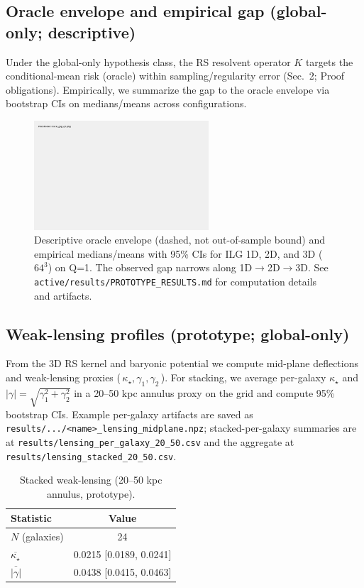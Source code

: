 \documentclass[fleqn,usenatbib]{mnras}
\begin{document}
\subsection{Oracle envelope and empirical gap (global-only; descriptive)}
\noindent Under the global-only hypothesis class, the RS resolvent operator $K$ targets the conditional-mean risk (oracle) within sampling/regularity error (Sec.~2; Proof obligations). Empirically, we summarize the gap to the oracle envelope via bootstrap CIs on medians/means across configurations.

\begin{figure}[h]
\centering
\includegraphics[width=0.58\textwidth]{results/oracle_gap_q1.png}
\caption{Descriptive oracle envelope (dashed, not out-of-sample bound) and empirical medians/means with 95\% CIs for ILG 1D, 2D, and 3D ($64^3$) on Q=1. The observed gap narrows along 1D$\to$2D$\to$3D. See \texttt{active/results/PROTOTYPE\_RESULTS.md} for computation details and artifacts.}
\label{fig:oracle_gap}
\end{figure}

\subsection{Weak-lensing profiles (prototype; global-only)}
\noindent From the 3D RS kernel and baryonic potential we compute mid-plane deflections and weak-lensing proxies (\,$\kappa_\star,\gamma_1,\gamma_2$\,). For stacking, we average per-galaxy $\kappa_\star$ and $|\gamma|=\sqrt{\gamma_1^2+\gamma_2^2}$ in a 20--50 kpc annulus proxy on the grid and compute 95\% bootstrap CIs. Example per-galaxy artifacts are saved as \texttt{results/.../<name>\_lensing\_midplane.npz}; stacked-per-galaxy summaries are at \texttt{results/lensing\_per\_galaxy\_20\_50.csv} and the aggregate at \texttt{results/lensing\_stacked\_20\_50.csv}.
\begin{table}[h]
\centering
\caption{Stacked weak-lensing (20--50 kpc annulus, prototype).}
\label{tab:stacked_lensing}
\begin{tabular}{l c}
\toprule
Statistic & Value \\
\midrule
$N$ (galaxies) & 24 \\
$\overline{\kappa_\star}$ & 0.0215 [0.0189, 0.0241] \\
$\overline{|\gamma|}$ & 0.0438 [0.0415, 0.0463] \\
\bottomrule
\end{tabular}
\end{table}
\end{document}
